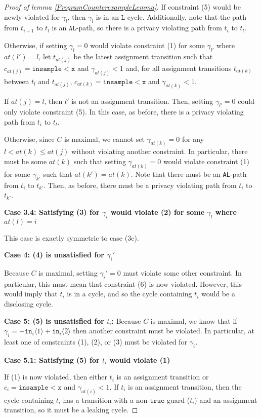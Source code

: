 \documentclass[12pt]{article}
\newcommand{\lguard}[1][x]{\texttt{insample} < #1}
\newcommand{\brangle}[1]{\langle #1 \rangle}
\theoremstyle{definition}
\begin{document}
\begin{proof}[Proof of lemma \ref{ProgramCounterexampleLemma}]
    If constraint (5) would be newly violated for $\gamma_l$, then $\gamma_l$ is in an $\texttt{L}$-cycle. Additionally, note that the path from $t_{i+1}$ to $t_l$ is an $\texttt{AL}$-path, so there is a privacy violating path from $t_i$ to $t_l$. 

    Otherwise, if setting $\gamma_l = 0$ would violate constraint (1) for some $\gamma_{l'}$ where $at(l')=l$, let $t_{at(j)}$ be the latest assignment transition such that $c_{at(j)} = \lguard[\texttt{x}]$ and $\gamma_{at(j)}<1$ and, for all assignment transitions $t_{at(k)}$ between $t_l$ and $t_{at(j)}$, $c_{at(k)} = \lguard[\texttt{x}]$ and $\gamma_{at(k)}<1$. 

    If $at(j) = l$, then $l'$ is not an assignment transition. Then, setting $\gamma_{l'} = 0$ could only violate constraint (5). In this case, as before, there is a privacy violating path from $t_i$ to $t_l$. 

    Otherwise, since $C$ is maximal, we cannot set $\gamma_{at(k)}=0$ for any $l<at(k)\leq at(j)$ without violating another constraint. In particular, there must be some $at(k)$ such that setting $\gamma_{at(k)} = 0$ would violate constraint (1) for some $\gamma_{k'}$ such that $at(k') = at(k)$. Note that there must be an \texttt{AL}-path from $t_i$ to $t_{k'}$. Then, as before, there must be a privacy violating path from $t_i$ to $t_{k'}$. 


    \textbf{Case 3.4: Satisfying (3) for $\gamma_i$ would violate (2) for some $\gamma_l$ where $at(l) = i$} 

    This case is exactly symmetric to case (3c).

    \textbf{Case 4: (4) is unsatisfied for $\gamma_i'$}
    
    Because $C$ is maximal, setting $\gamma_i'=0$ must violate some other constraint. In particular, this must mean that constraint (6) is now violated. However, this would imply that $t_i$ is in a cycle, and so the cycle containing $t_i$ would be a disclosing cycle.

    \textbf{Case 5: (5) is unsatisfied for $t_i$:} Because $C$ is maximal, we know that if $\gamma_i = -\texttt{in}_i\brangle{1}+\texttt{in}_i\brangle{2}$ then another constraint must be violated. In particular, at least one of constraints (1), (2), or (3) must be violated for $\gamma_i$. 
    
    \textbf{Case 5.1: Satisfying (5) for $t_i$ would violate (1)}

    If (1) is now violated, then either $t_i$ is an assignment transition or $c_i = \lguard[\texttt{x}]$ and $\gamma_{at(i)}<1$. If $t_i$ is an assignment transition, then the cycle containing $t_i$ has a transition with a non-$\texttt{true}$ guard ($t_i$) and an assignment transition, so it must be a leaking cycle. 


\end{proof}
\end{document}
